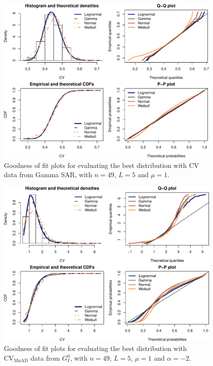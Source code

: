 \documentclass[remotesensing,article,submit,moreauthors,pdftex]{Definitions/mdpi}
\begin{document}
\begin{figure}[H]

{\centering \includegraphics[width=1\linewidth]{Identifying-Heterogeneity-in-SAR-Data-with-New-Test-Statistics_files/figure-latex/Plot_cv_gamma-1} 

}

\caption{Goodness of fit plots for evaluating the best distribution with CV data from Gamma SAR, with  $n=49$, $L=5$ and $\mu=1$.}\label{fig:Plot_cv_gamma}
\end{figure}

\begin{figure}[H]

{\centering \includegraphics[width=1\linewidth]{Identifying-Heterogeneity-in-SAR-Data-with-New-Test-Statistics_files/figure-latex/Plot_cv-1} 

}

\caption{Goodness of fit plots for evaluating the best distribution with $\text{CV}_{\text{MnAD}}$ data from $G_I^0$, with  $n=49$, $L=5$, $\mu=1$ and $\alpha=-2$.}\label{fig:Plot_cv}
\end{figure}
\end{document}

